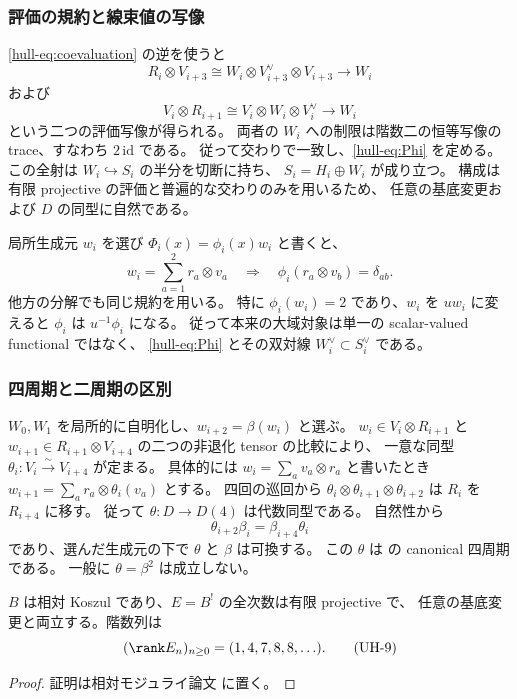 \subsubsection{評価の規約と線束値の写像}

\eqref{hull-eq:coevaluation} の逆を使うと
\[
 R_i\otimes V_{i+3}\cong
 W_i\otimes V_{i+3}^{\vee}\otimes V_{i+3}\longrightarrow W_i
\]
および
\[
 V_i\otimes R_{i+1}\cong
 V_i\otimes W_i\otimes V_i^{\vee}\longrightarrow W_i
\]
という二つの評価写像が得られる。
両者の $W_i$ への制限は階数二の恒等写像の trace、すなわち $2\,\mathrm{id}$ である。
従って交わりで一致し、\eqref{hull-eq:Phi} を定める。
この全射は $W_i\hookrightarrow S_i$ の半分を切断に持ち、
$S_i=H_i\oplus W_i$ が成り立つ。
構成は有限 projective の評価と普遍的な交わりのみを用いるため、
任意の基底変更および $D$ の同型に自然である。

局所生成元 $w_i$ を選び $\Phi_i(x)=\phi_i(x)w_i$ と書くと、
\[
 w_i=\sum_{a=1}^2r_a\otimes v_a
 \quad\Longrightarrow\quad
 \phi_i(r_a\otimes v_b)=\delta_{ab}.
 \tag{UH-7}\label{hull-eq:inverse-coeval}
\]
他方の分解でも同じ規約を用いる。
特に $\phi_i(w_i)=2$ であり、$w_i$ を $u w_i$ に変えると
$\phi_i$ は $u^{-1}\phi_i$ になる。
従って本来の大域対象は単一の scalar-valued functional ではなく、
\eqref{hull-eq:Phi} とその双対線 $W_i^{\vee}\subset S_i^{\vee}$ である。

\subsubsection{四周期と二周期の区別}

$W_0,W_1$ を局所的に自明化し、$w_{i+2}=\beta(w_i)$ と選ぶ。
$w_i\in V_i\otimes R_{i+1}$ と
$w_{i+1}\in R_{i+1}\otimes V_{i+4}$ の二つの非退化 tensor の比較により、
一意な同型 $\theta_i:V_i\xrightarrow{\sim}V_{i+4}$ が定まる。
具体的には $w_i=\sum_a v_a\otimes r_a$ と書いたとき
$w_{i+1}=\sum_a r_a\otimes\theta_i(v_a)$ とする。
四回の巡回から $\theta_i\otimes\theta_{i+1}\otimes\theta_{i+2}$ は
$R_i$ を $R_{i+4}$ に移す。
従って $\theta:D\to D(4)$ は代数同型である。
自然性から
\[
 \theta_{i+2}\beta_i=\beta_{i+4}\theta_i
 \tag{UH-8}\label{hull-eq:commute}
\]
であり、選んだ生成元の下で $\theta$ と $\beta$ は可換する。
この $\theta$ は \cite[\S5.2, (5.2)]{VdB2011} の canonical 四周期である。
一般に $\theta=\beta^2$ は成立しない。

\begin{lemma}
\label{hull-lem:even-koszul}
$B$ は相対 Koszul であり、$E=B^!$ の全次数は有限 projective で、
任意の基底変更と両立する。階数列は
\[
 (\rank E_n)_{n\ge0}=(1,4,7,8,8,\ldots).
 \tag{UH-9}\label{hull-eq:E-ranks}
\]
\end{lemma}
\begin{proof}
証明は相対モジュライ論文 \cite[\texttt{universal_cubic_hull}]{QuadricModuli2026} に置く。
\end{proof}

